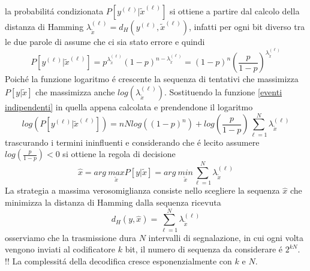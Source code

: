             la probabilitá condizionata $P\left[y^{(\ell)}|\tilde{x}^{(\ell)}\right]$ si ottiene a partire dal calcolo della distanza di Hamming 
            $\lambda^{(\ell)}_{\tilde{x}} = d_H(y^{(\ell)},\tilde{x}^{(\ell)})$, infatti per ogni bit diverso tra le due parole di assume che ci sia stato errore e quindi 
            \[
                P\left[y^{(\ell)}|\tilde{x}^{(\ell)}\right] = p^{\lambda^{(\ell)}_{\tilde{x}}}(1-p)^{n-\lambda^{(\ell)}_{\tilde{x}}} = (1-p)^n\left(\frac{p}{1-p}\right)^{\lambda^{(\ell)}_{\tilde{x}}}
            \]
            Poiché la funzione logaritmo é crescente la sequenza di tentativi che massimizza $P[y|\tilde{x}]$ che massimizza anche $log\left(\lambda^{(\ell)}_{\tilde{x}}\right)$.
            Sostituendo la funzione \ref{eventi indipendenti} in quella appena calcolata e prendendone il logaritmo
            \[
                log\left(P\left[y^{(\ell)}|\tilde{x}^{(\ell)}\right]\right) =nNlog \left((1-p)^n\right) + log\left(\frac{p}{1-p}\right)\sum_{\ell=1}^{N}\lambda^{(\ell)}_{\tilde{x}}
            \]
            trascurando i termini ininfluenti e considerando che é lecito assumere $log\left(\frac{p}{1-p}\right)<0$ si ottiene la regola di decisione 
            \[
                \hat{x} = arg\ \underset{\tilde{x}}{max}P[y|\tilde{x}] = arg\ \underset{\tilde{x}}{min}\sum_{\ell=1}^{N}\lambda^{(\ell)}_{\tilde{x}}
            \]
            La strategia a massima verosomiglianza consiste nello scegliere la sequenza $\hat{x}$ che minimizza la distanza di Hamming dalla sequenza 
            ricevuta 
            \[
                d_H(y,\hat{x}) = \sum_{\ell=1}^{N}\lambda^{(\ell)}_{\tilde{x}}
            \]
            osserviamo che la trasmissione dura $N$ intervalli di segnalazione, in cui ogni volta vengono inviati al codificatore $k$ bit, 
            il numero di sequenza da considerare é $2^{kN}$. !! La complessitá della decodifica cresce esponenzialmente con $k$ e $N$.

